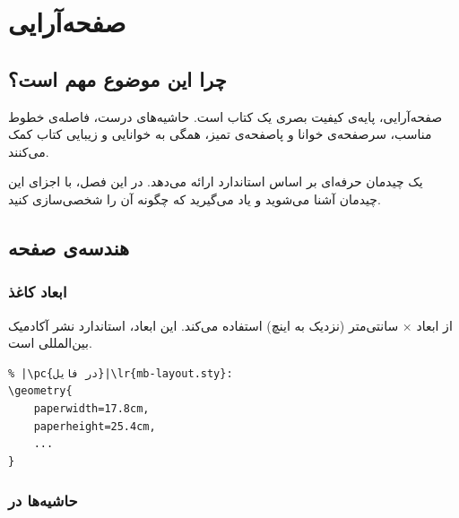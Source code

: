
\chapter{صفحه‌آرایی}
\label{chap:layout}

\section{چرا این موضوع مهم است؟}
\label{sec:layout-why}

صفحه‌آرایی، پایه‌ی کیفیت بصری یک کتاب است.
حاشیه‌های درست، فاصله‌ی خطوط مناسب، سرصفحه‌ی
خوانا و پاصفحه‌ی تمیز، همگی به خوانایی و
زیبایی کتاب کمک می‌کنند.

 یک چیدمان حرفه‌ای بر اساس
استاندارد  ارائه می‌دهد.
در این فصل، با اجزای این چیدمان آشنا
می‌شوید و یاد می‌گیرید که چگونه آن را
شخصی‌سازی کنید.


\section{هندسه‌ی صفحه}
\label{sec:layout-geometry}

\subsection{ابعاد کاغذ}
\label{sec:layout-paper}

 از ابعاد  ×
 سانتی‌متر (نزدیک به 
اینچ) استفاده می‌کند. این ابعاد، استاندارد
نشر آکادمیک بین‌المللی است.

\begin{latin}
\begin{verbatim}
% |\pc{در فایل}|\lr{mb-layout.sty}:
\geometry{
    paperwidth=17.8cm,
    paperheight=25.4cm,
    ...
}
\end{verbatim}
\end{latin}


\subsection{حاشیه‌ها در }
\label{sec:layout-margins-main}


